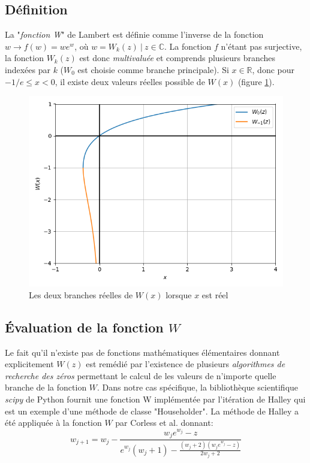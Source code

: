 \subsection{Définition}
La "\textit{fonction W}" de Lambert est définie comme l'inverse de la fonction $w \rightarrow f(w) =  w e^w$, où $w = W_k(z)\ |\ z \in \mathbb{C}$. La fonction $f$ n'étant pas surjective, la fonction $W_k(z)$ est donc \textit{multivaluée} et comprends plusieurs branches indexées par $k$ ($W_0$ est choisie comme branche principale). Si $x \in \mathbb{R}$, donc pour $-1/e \leq x < 0$, il existe deux valeurs réelles possible de $W(x)$ (figure \ref{fig:lambertw}).

\begin{figure} 
  \begin{center}
    \includegraphics[width=.6\textwidth]{resources/lambertw.png}
    \caption{Les deux branches réelles de $W(x)$ lorsque $x$ est réel}
    \label{fig:lambertw}
  \end{center}
\end{figure}

\subsection{Évaluation de la fonction $W$}

Le fait qu'il n'existe pas de fonctions mathématiques élémentaires donnant explicitement $W(z)$ est remédié par l'existence de plusieurs \textit{algorithmes de recherche des zéros} permettant le calcul de les valeurs de n'importe quelle branche de la fonction $W$. Dans notre cas spécifique, la bibliothèque scientifique \textit{scipy} de Python fournit une fonction W implémentée par l'itération de Halley qui est un exemple d'une méthode de classe "Householder". La méthode de Halley a été appliquée à la fonction $W$  par Corless et al. \cite{Corless1996} donnant:
\begin{equation}
  \label{eq:halley}
  w_{j+1} = w_j - \frac{w_j e^{w_j} - z}{e^{w_j}(w_j + 1) - \frac{(w_j + 2)(w_j e^{w_j} - z)}{2w_j + 2}}
\end{equation}

